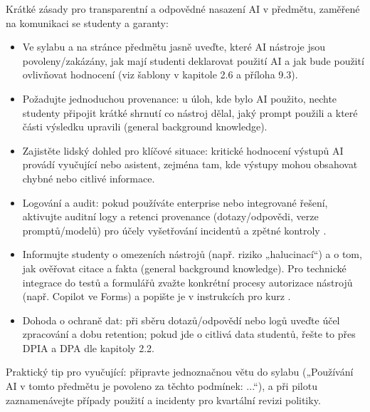 Krátké zásady pro transparentní a odpovědné nasazení AI v předmětu, zaměřené na komunikaci se studenty a garanty:

\begin{itemize}
  \item Ve sylabu a na stránce předmětu jasně uveďte, které AI nástroje jsou povoleny/zakázány, jak mají studenti deklarovat použití AI a jak bude použití ovlivňovat hodnocení (viz šablony v kapitole 2.6 a příloha 9.3). %
  \item Požadujte jednoduchou provenance: u úloh, kde bylo AI použito, nechte studenty připojit krátké shrnutí co nástroj dělal, jaký prompt použili a které části výsledku upravili (general background knowledge).
  \item Zajistěte lidský dohled pro klíčové situace: kritické hodnocení výstupů AI provádí vyučující nebo asistent, zejména tam, kde výstupy mohou obsahovat chybné nebo citlivé informace.
  \item Logování a audit: pokud používáte enterprise nebo integrované řešení, aktivujte auditní logy a retenci provenance (dotazy/odpovědi, verze promptů/modelů) pro účely vyšetřování incidentů a zpětné kontroly \cite{kb_ai_101_tipu_pdf_04e4a115_page_3_1}.
  \item Informujte studenty o omezeních nástrojů (např. riziko „halucinací“) a o tom, jak ověřovat citace a fakta (general background knowledge). Pro technické integrace do testů a formulářů zvažte konkrétní procesy autorizace nástrojů (např. Copilot ve Forms) a popište je v instrukcích pro kurz \cite{kb_ai_101_tipu_pdf_04e4a115_page_36_1}.
  \item Dohoda o ochraně dat: při sběru dotazů/odpovědí nebo logů uveďte účel zpracování a dobu retention; pokud jde o citlivá data studentů, řešte to přes DPIA a DPA dle kapitoly 2.2. %
\end{itemize}

Praktický tip pro vyučující: připravte jednoznačnou větu do sylabu („Používání AI v tomto předmětu je povoleno za těchto podmínek: ...“), a při pilotu zaznamenávejte případy použití a incidenty pro kvartální revizi politiky.